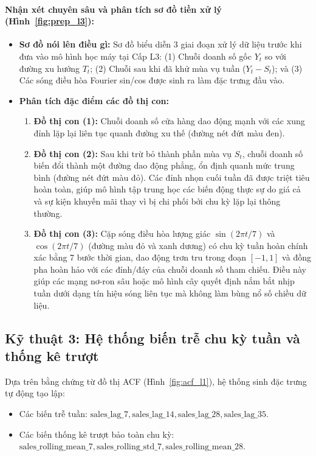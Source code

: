 \documentclass[12pt,a4paper,oneside]{article}
\begin{document}
\paragraph{Nhận xét chuyên sâu và phân tích sơ đồ tiền xử lý (Hình~\ref{fig:prep_l3}):}
\begin{itemize}
    \item \textbf{Sơ đồ nói lên điều gì:} Sơ đồ biểu diễn 3 giai đoạn xử lý dữ liệu trước khi đưa vào mô hình học máy tại Cấp L3: (1) Chuỗi doanh số gốc $Y_t$ so với đường xu hướng $T_t$; (2) Chuỗi sau khi đã khử mùa vụ tuần ($Y_t - S_t$); và (3) Các sóng điều hòa Fourier sin/cos được sinh ra làm đặc trưng đầu vào.
    \item \textbf{Phân tích đặc điểm các đồ thị con:}
    \begin{enumerate}
        \item \textbf{Đồ thị con (1):} Chuỗi doanh số cửa hàng dao động mạnh với các xung đỉnh lặp lại liên tục quanh đường xu thế (đường nét đứt màu đen).
        \item \textbf{Đồ thị con (2):} Sau khi trừ bỏ thành phần mùa vụ $S_t$, chuỗi doanh số biến đổi thành một đường dao động phẳng, ổn định quanh mức trung bình (đường nét đứt màu đỏ). Các đỉnh nhọn cuối tuần đã được triệt tiêu hoàn toàn, giúp mô hình tập trung học các biến động thực sự do giá cả và sự kiện khuyến mãi thay vì bị chi phối bởi chu kỳ lặp lại thông thường.
        \item \textbf{Đồ thị con (3):} Cặp sóng điều hòa lượng giác $\sin(2\pi t/7)$ và $\cos(2\pi t/7)$ (đường màu đỏ và xanh dương) có chu kỳ tuần hoàn chính xác bằng 7 bước thời gian, dao động trơn tru trong đoạn $[-1, 1]$ và đồng pha hoàn hảo với các đỉnh/đáy của chuỗi doanh số tham chiếu. Điều này giúp các mạng nơ-ron sâu hoặc mô hình cây quyết định nắm bắt nhịp tuần dưới dạng tín hiệu sóng liên tục mà không làm bùng nổ số chiều dữ liệu.
    \end{enumerate}
\end{itemize}

\subsection{Kỹ thuật 3: Hệ thống biến trễ chu kỳ tuần và thống kê trượt}
Dựa trên bằng chứng từ đồ thị ACF (Hình~\ref{fig:acf_l1}), hệ thống sinh đặc trưng tự động tạo lập:
\begin{itemize}
    \item Các biến trễ tuần: $\mathrm{sales\_lag\_7}, \mathrm{sales\_lag\_14}, \mathrm{sales\_lag\_28}, \mathrm{sales\_lag\_35}$.
    \item Các biến thống kê trượt bảo toàn chu kỳ: $\mathrm{sales\_rolling\_mean\_7}, \mathrm{sales\_rolling\_std\_7}, \mathrm{sales\_rolling\_mean\_28}$.
\end{itemize}
\end{document}
